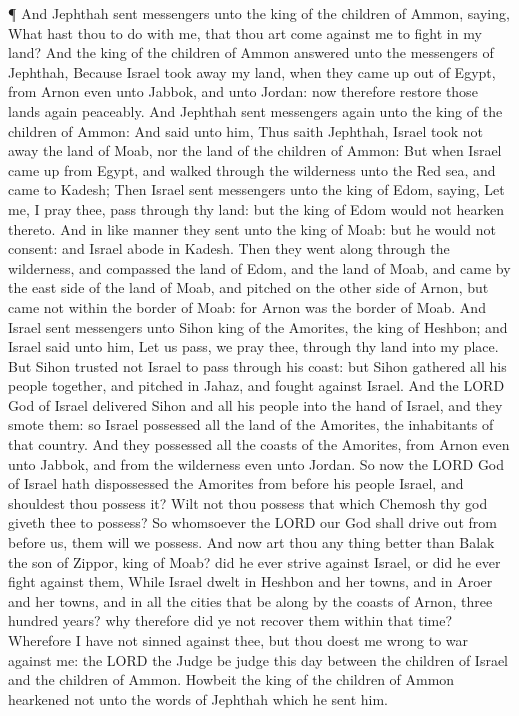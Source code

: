  ¶ And Jephthah sent messengers unto the king of the
children of Ammon, saying, What hast thou to do with me, that thou art
come against me to fight in my land?  And the king of the
children of Ammon answered unto the messengers of Jephthah, Because
Israel took away my land, when they came up out of Egypt, from Arnon
even unto Jabbok, and unto Jordan: now therefore restore those lands
again peaceably.  And Jephthah sent messengers again unto
the king of the children of Ammon:  And said unto him, Thus
saith Jephthah, Israel took not away the land of Moab, nor the land of
the children of Ammon:  But when Israel came up from Egypt,
and walked through the wilderness unto the Red sea, and came to Kadesh;
 Then Israel sent messengers unto the king of Edom, saying,
Let me, I pray thee, pass through thy land: but the king of Edom would
not hearken thereto. And in like manner they sent unto the king of Moab:
but he would not consent: and Israel abode in Kadesh.  Then
they went along through the wilderness, and compassed the land of Edom,
and the land of Moab, and came by the east side of the land of Moab, and
pitched on the other side of Arnon, but came not within the border of
Moab: for Arnon was the border of Moab.  And Israel sent
messengers unto Sihon king of the Amorites, the king of Heshbon; and
Israel said unto him, Let us pass, we pray thee, through thy land into
my place.  But Sihon trusted not Israel to pass through his
coast: but Sihon gathered all his people together, and pitched in Jahaz,
and fought against Israel.  And the LORD God of Israel
delivered Sihon and all his people into the hand of Israel, and they
smote them: so Israel possessed all the land of the Amorites, the
inhabitants of that country.  And they possessed all the
coasts of the Amorites, from Arnon even unto Jabbok, and from the
wilderness even unto Jordan.  So now the LORD God of Israel
hath dispossessed the Amorites from before his people Israel, and
shouldest thou possess it?  Wilt not thou possess that
which Chemosh thy god giveth thee to possess? So whomsoever the LORD our
God shall drive out from before us, them will we possess. 
And now art thou any thing better than Balak the son of Zippor, king of
Moab? did he ever strive against Israel, or did he ever fight against
them,  While Israel dwelt in Heshbon and her towns, and in
Aroer and her towns, and in all the cities that be along by the coasts
of Arnon, three hundred years? why therefore did ye not recover them
within that time?  Wherefore I have not sinned against
thee, but thou doest me wrong to war against me: the LORD the Judge be
judge this day between the children of Israel and the children of Ammon.
 Howbeit the king of the children of Ammon hearkened not
unto the words of Jephthah which he sent him.

